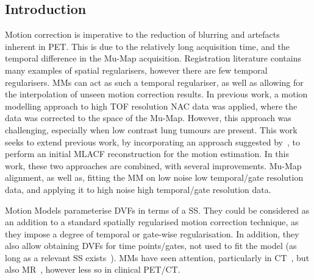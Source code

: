         \subsection{Introduction} \label{sec:pet_ct_motion_correction_exploiting_motion_models_fit_on_coarsely_gated_data_applied_to_finely_gated_data_introduction}
            Motion correction is imperative to the reduction of blurring and artefacts inherent in \gls{PET}. This is due to the relatively long acquisition time, and the temporal difference in the \gls{Mu-Map} acquisition. Registration literature contains many examples of spatial regularisers, however there are few temporal regularisers. \glspl{MM} can act as such a temporal regulariser, as well as allowing for the interpolation of unseen motion correction results. In previous work, a motion modelling approach to high \gls{TOF} resolution \gls{NAC} data was applied, where the data was corrected to the space of the \gls{Mu-Map}. However, this approach was challenging, especially when low contrast lung tumours are present. This work seeks to extend previous work, by incorporating an approach suggested by~\parencite{Lu2018RespiratoryData}, to perform an initial \gls{MLACF} reconstruction for the motion estimation. In this work, these two approaches are combined, with several improvements. \gls{Mu-Map} alignment, as well as, fitting the \gls{MM} on low noise low temporal/gate resolution data, and applying it to high noise high temporal/gate resolution data.%
            
            Motion Models parameterise \glspl{DVF} in terms of a \gls{SS}. They could be considered as an addition to a standard spatially regularised motion correction technique, as they impose a degree of temporal or gate-wise regularisation. In addition, they also allow obtaining \glspl{DVF} for time points/gates, not used to fit the model (as long as a relevant \gls{SS} exists~\parencite{McClelland2013}). \glspl{MM} have seen attention, particularly in \gls{CT}~\parencite{Li2007EnhancedModel}, but also \gls{MR}~\parencite{Manke2002RespiratoryModels, Manber2016JointCorrection}, however less so in clinical \gls{PET}/\gls{CT}.
            
